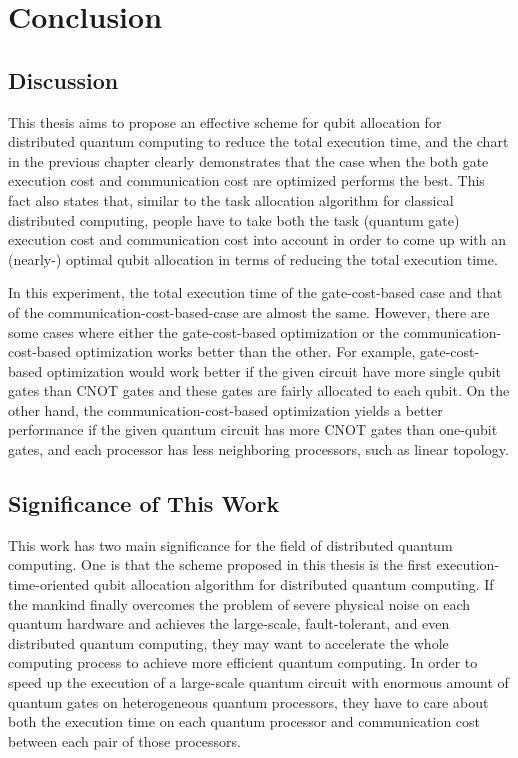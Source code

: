 \chapter{Conclusion}
\label{discussion}

\section{Discussion} 

This thesis aims to propose an effective scheme for qubit allocation for distributed quantum computing to reduce the total execution time, and the chart in the previous chapter clearly demonstrates that the case when the both gate execution cost and communication cost are optimized performs the best.  This fact also states that, similar to the task allocation algorithm for classical distributed computing, people have to take both the task (quantum gate) execution cost and communication cost into account in order to come up with an (nearly-) optimal qubit allocation in terms of reducing the total execution time.

 In this experiment, the total execution time of the gate-cost-based case and that of the communication-cost-based-case are almost the same. However, there are some cases where either the gate-cost-based optimization or the communication-cost-based optimization works better than the other.  For example, gate-cost-based optimization would work better if the given circuit have more single qubit gates than CNOT gates and these gates are fairly allocated to each qubit.  On the other hand, the communication-cost-based optimization yields a better performance if the given quantum circuit has more CNOT gates than one-qubit gates, and each processor has less neighboring processors, such as linear topology.
 
 \section{Significance of This Work}

 This work has two main significance for the field of distributed quantum computing. 
 One is that the scheme proposed in this thesis is the first execution-time-oriented qubit allocation algorithm for distributed quantum computing. If the mankind finally overcomes the problem of severe physical noise on each quantum hardware and achieves the large-scale, fault-tolerant, and even distributed quantum computing, they may want to accelerate the whole computing process to achieve more efficient quantum computing. In order to speed up the execution of a large-scale quantum circuit with enormous amount of quantum gates on heterogeneous quantum processors, they have to care about both the execution time on each quantum processor and communication cost between each pair of those processors. 
 
